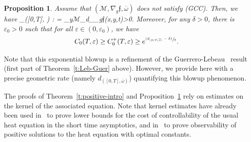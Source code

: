 \documentclass[11pt]{article}
\numberwithin{equation}{section}
\newcommand{\pGCC}{\textup{(GCC)}\xspace}
\newcommand{\psfrac}[2]{\sfrac{(#1)}{#2}}
\newtheorem{proposition}[lemma]{Proposition}
\theoremstyle{definition}
\newcommand{\M}{\ensuremath{\mathcal M}}
\newcommand{\f}{\ensuremath{\mathfrak{f}}}
\def\bal#1\nal{\begin{align*}#1\end{align*}}
\let\e\varepsilon
\let\eps\varepsilon
\begin{document}
\begin{proposition}
\label{proplowerobse+}
Assume that $(\M,\nabla_g \f,\overline{\omega})$ does not satisfy \pGCC. Then, we have
\bal
d_{([0,T], \overline{\omega})} : = \sup_{y\in \M}\inf_{}d_{\nabla_g\f}(x,y,t)>0.
\nal
Moreover, for any $\delta>0$, there is $\e_0>0$ such that for all $\eps \in (0,\eps_0)$, we have
\begin{equation}
C_{0}(T,\e)\geq C_{0}^{+}(T,\e)\geq e^{\psfrac{d_{([0,T], \overline{\omega})}-\delta}{\e}}\label{lowercost+}.
\end{equation}
\end{proposition}
Note that this exponential blowup is a refinement of the Guerrero-Lebeau~\cite{GL:07} result (first part of Theorem~\ref{t:Leb-Guer} above). However, we provide here with a precise geometric rate (namely $d_{([0,T], \overline{\omega})}$) quantifying this blowup phenomenon.

The proofs of Theorem~\ref{t:positive-intro} and Proposition~\ref{proplowerobse+} rely on estimates on the kernel of the associated equation. Note that kernel estimates have already been used in~\cite{Miller:04} to prove lower bounds for the cost of controllability of the usual heat equation in the short time asymptotics, and in~\cite{LL:18} to prove observability of positive solutions to the heat equation with optimal constants.
\end{document}
